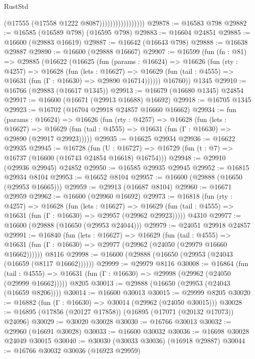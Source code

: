 \begin{lexlean}{RustStd}
\begin{coremodule}
{\begin{coremodule}
{{{{{{{{{{{{{{{{{{{{{{{{{{{{{{{{{{{{{{{{{{{{{{{{{{{{{{{                                  (@17555 (@17558 @1222 @8087)))))))))))))))))
@29878 := @16583 @798
@29882 := @16585 (@16589 @798) (@16595 @798)
@29883 := @16604 @24851
@29885 := @16600 (@29883 @16619)
@29887 := @16642 (@16643 @798)
@29888 := @16638 @29887
@29890 := @16600 (@29888 @16667)
@29907 := @16599
    (fun (fn : @81) =>
    @29885
      (@16622
        (@16625
          (fun (params : @16624) =>
          @16626
            (fun (rty : @4257) =>
            @16628
              (fun (lets : @16627) =>
              @16629 (fun (tail : @4555) => @16631 (fun (Γ : @16630) => @29890 @16714))))))
        @16760))
    @1345
@29910 := @16766 (@29883 (@16617 @1345))
@29913 := @16679 (@16680 @1345) @24854
@29917 := @16600 (@16671 (@29913 @16688) @16692)
@29918 := @16705 @1345
@29923 := @16702 (@16704 @29918 @24857 @16660 @16662)
@29934 := fun (params : @16624) =>
  @16626
    (fun (rty : @4257) =>
    @16628
      (fun (lets : @16627) =>
      @16629 (fun (tail : @4555) => @16631 (fun (Γ : @16630) => @29890 (@29917 @29923)))))
@29935 := @16625 @29934
@29936 := @16622 @29935
@29945 := @16728
    (fun (U : @16727) => @16729 (fun (t : @7) => @16737 (@16600 (@16743 @24854 @16618) @16754)))
@29948 := @29910 (@29936 @29945) @24852
@29950 := @16585 @29935 @29945
@29952 := @16815 @29934 @8104
@29953 := @16652 @8104
@29957 := @16600 (@29888 (@16650 (@29953 @16665)))
@29959 := @29913 (@16687 @8104)
@29960 := @16671 @29959
@29962 := @16600 (@29960 @16692)
@29973 := @16818
    (fun (rty : @4257) =>
    @16628
      (fun (lets : @16627) =>
      @16629 (fun (tail : @4555) => @16631 (fun (Γ : @16630) => @29957 (@29962 @29923)))))
    @4310
@29977 := @16600 (@29888 (@16650 (@29953 @24044)))
@29979 := @24051 @29918 @24857
@29991 := @16840
    (fun (lets : @16627) =>
    @16629
      (fun (tail : @4555) =>
      @16631 (fun (Γ : @16630) => @29977 (@29962 (@24050 (@29979 @16660 @16662))))))
    @8116
@29998 := @16600 (@29888 (@16650 (@29953 (@24043 (@16659 (@8117 @16662))))))
@29999 := @29979 @8116
@30008 := @16864
    (fun (tail : @4555) => @16631 (fun (Γ : @16630) => @29998 (@29962 (@24050 (@29999 @16662)))))
    @8205
@30013 := @29888 (@16650 (@29953 (@24043 (@16659 @8206))))
@30014 := @16600 @30013
@30015 := @29999 @8205
@30020 := @16882 (fun (Γ : @16630) => @30014 (@29962 (@24050 @30015)))
@30028 := @16895 (@17856 (@20127 @17858)) (@16895 (@17071 (@20132 @17073)) @24096)
@30029 := @30020 @30028
@30030 := @16766 @30013
@30032 := @29960 (@16691 @30028)
@30033 := @16600 @30032
@30036 := @16698 @30028 @24049 @30015
@30040 := @30030 (@30033 @30036) (@16918 @29887)
@30044 := @16766 @30032 @30036 (@16923 @29959)
}}}}}}}}}}}}}}}}}}}}}}}}}}}}}}}}}}}}}}}}}}}}}}}}}}}}}}}
\end{coremodule}}
\end{coremodule}
\end{lexlean}
